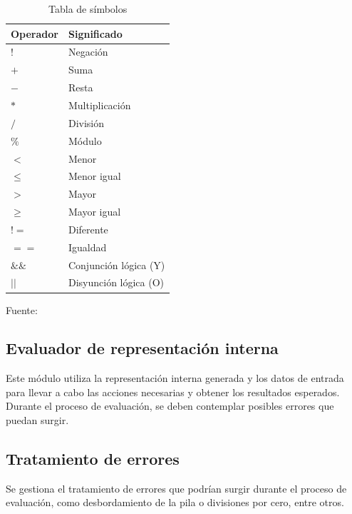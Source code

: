 \begin{table}[!h]
  \begin{center}
    \begin{tabularx}{0.8\textwidth}{|X|X|}
      \hline
      \textbf{Operador} & \textbf{Significado} \\
      \hline
      $!$ & Negación \\
      \hline
      $+$ & Suma \\
      \hline
      $-$ & Resta \\
      \hline
      $*$ & Multiplicación \\
      \hline
      $/$ & División \\
      \hline
      $\%$ & Módulo \\
      \hline
      $<$ & Menor \\
      \hline
      $\leq$ & Menor igual \\
      \hline
      $>$ & Mayor \\
      \hline
      $\geq$ & Mayor igual \\
      \hline
      $!=$ & Diferente \\
      \hline
      $==$ & Igualdad \\
      \hline
      $\&\&$ & Conjunción lógica (Y) \\
      \hline
      $||$ & Disyunción lógica (O) \\
      \hline
    \end{tabularx}
  \end{center}
  \caption{Tabla de símbolos}
  \centering Fuente: \parencite{FERNANDEZ-OLIVA2016}
  \label{tab:simbolos}
\end{table}

\subsection{Evaluador de representación interna}
Este módulo utiliza la representación interna generada y los datos de entrada para llevar a cabo las acciones necesarias y obtener los resultados esperados. Durante el proceso de evaluación, se deben contemplar posibles errores que puedan surgir. \parencite{LabraGayo2003}

\subsection{Tratamiento de errores}
Se gestiona el tratamiento de errores que podrían surgir durante el proceso de evaluación, como desbordamiento de la pila o divisiones por cero, entre otros. \parencite{LabraGayo2003}

